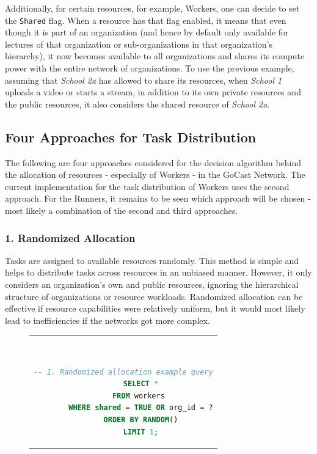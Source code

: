 Additionally, for certain resources, for example, Workers, one can decide to set the \texttt{Shared} flag. When a resource has that flag enabled, it means that even though it is part of an organization (and hence by default only available for lectures of that organization or sub-organizations in that organization's hierarchy), it now becomes available to all organizations and shares its compute power with the entire network of organizations. To use the previous example, assuming that \textit{School 2a} has allowed to share its resources, when \textit{School 1} uploads a video or starts a stream, in addition to its own private resources and the public resources, it also considers the shared resource of \textit{School 2a}.

\subsection{Four Approaches for Task Distribution}

The following are four approaches considered for the decision algorithm behind the allocation of resources - especially of Workers - in the GoCast Network. The current implementation for the task distribution of Workers uses the second approach. For the Runners, it remains to be seen which approach will be chosen - most likely a combination of the second and third approaches. 

\subsubsection{1. Randomized Allocation}
     Tasks are assigned to available resources randomly. This method is simple and helps to distribute tasks across resources in an unbiased manner. However, it only considers an organization's own and public resources, ignoring the hierarchical structure of organizations or resource workloads. Randomized allocation can be effective if resource capabilities were relatively uniform, but it would most likely lead to inefficiencies if the networks got more complex.

    \begin{figure}[htpb]
      \begin{tabular}{c}
      \ \small \begin{lstlisting}[language=SQL]
        -- 1. Randomized allocation example query
        SELECT *
        FROM workers 
        WHERE shared = TRUE OR org_id = ?
        ORDER BY RANDOM()
        LIMIT 1;
        \end{lstlisting}
      \end{tabular}
      \label{fig:randomized-allocation}
    \end{figure}
    
